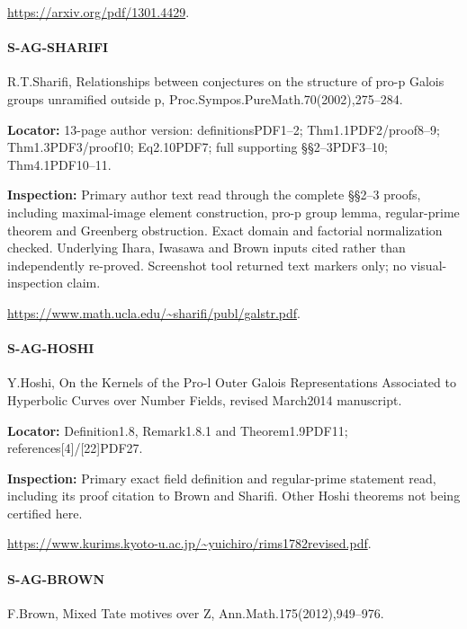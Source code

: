\documentclass[11pt,a4paper]{article}
\begin{document}
\url{https://arxiv.org/pdf/1301.4429}.

\paragraph{S-AG-SHARIFI} R.\allowbreak{}T.\allowbreak{}Sharifi, Relationships between conjectures on the structure of pro-p Galois groups unramified outside p, Proc.\allowbreak{}Sympos.\allowbreak{}PureMath.\allowbreak{}70(2002),275–\allowbreak{}284.

\textbf{Locator:} 13-page author version:\allowbreak{} definitionsPDF1–\allowbreak{}2; Thm1.\allowbreak{}1PDF2/\allowbreak{}proof8–\allowbreak{}9; Thm1.\allowbreak{}3PDF3/\allowbreak{}proof10; Eq2.\allowbreak{}10PDF7; full supporting §§2–\allowbreak{}3PDF3–\allowbreak{}10; Thm4.\allowbreak{}1PDF10–\allowbreak{}11.

\textbf{Inspection:} Primary author text read through the complete §§2–\allowbreak{}3 proofs, including maximal-image element construction, pro-p group lemma, regular-prime theorem and Greenberg obstruction.\allowbreak{} Exact domain and factorial normalization checked.\allowbreak{} Underlying Ihara, Iwasawa and Brown inputs cited rather than independently re-proved.\allowbreak{} Screenshot tool returned text markers only; no visual-inspection claim.\allowbreak{}

\url{https://www.math.ucla.edu/~sharifi/publ/galstr.pdf}.

\paragraph{S-AG-HOSHI} Y.\allowbreak{}Hoshi, On the Kernels of the Pro-l Outer Galois Representations Associated to Hyperbolic Curves over Number Fields, revised March2014 manuscript.

\textbf{Locator:} Definition1.\allowbreak{}8, Remark1.\allowbreak{}8.\allowbreak{}1 and Theorem1.\allowbreak{}9PDF11; references[4]/\allowbreak{}[22]PDF27.

\textbf{Inspection:} Primary exact field definition and regular-prime statement read, including its proof citation to Brown and Sharifi.\allowbreak{} Other Hoshi theorems not being certified here.\allowbreak{}

\url{https://www.kurims.kyoto-u.ac.jp/~yuichiro/rims1782revised.pdf}.

\paragraph{S-AG-BROWN} F.\allowbreak{}Brown, Mixed Tate motives over Z, Ann.\allowbreak{}Math.\allowbreak{}175(2012),949–\allowbreak{}976.
\end{document}
